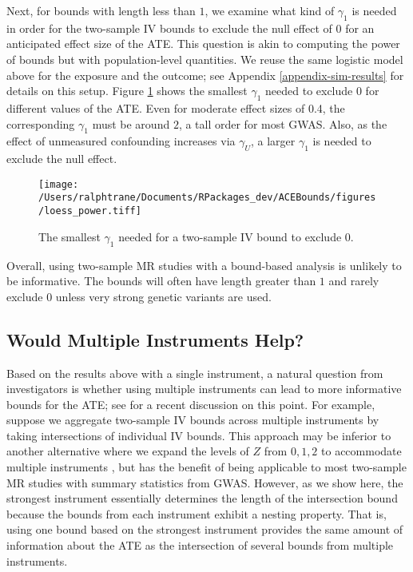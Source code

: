 \documentclass[AMA,STIX1COL,]{WileyNJD-v2}
\begin{document}
Next, for bounds with length less than \(1\), we examine what kind of
\(\gamma_1\) is needed in order for the two-sample IV bounds to exclude
the null effect of \(0\) for an anticipated effect size of the ATE. This
question is akin to computing the power of bounds but with
population-level quantities. We reuse the same logistic model above for
the exposure and the outcome; see Appendix \ref{appendix-sim-results}
for details on this setup. Figure \ref{fig:power_curves} shows the
smallest \(\gamma_1\) needed to exclude \(0\) for different values of
the ATE. Even for moderate effect sizes of 0.4, the corresponding
\(\gamma_1\) must be around \(2\), a tall order for most GWAS. Also, as
the effect of unmeasured confounding increases via \(\gamma_U\), a
larger \(\gamma_1\) is needed to exclude the null effect.

\begin{figure}[ht]
  \centering
  \texttt{[image: /Users/ralphtrane/Documents/RPackages\_dev/ACEBounds/figures/loess\_power.tiff]}
  \caption{The smallest $\gamma_1$ needed for a two-sample IV bound to exclude $0$.}
  \label{fig:power_curves}
\end{figure}

Overall, using two-sample MR studies with a bound-based analysis is
unlikely to be informative. The bounds will often have length greater
than \(1\) and rarely exclude \(0\) unless very strong genetic variants
are used.

\hypertarget{would-multiple-instruments-help}{%
\subsection{Would Multiple Instruments
Help?}\label{would-multiple-instruments-help}}

Based on the results above with a single instrument, a natural question
from investigators is whether using multiple instruments can lead to
more informative bounds for the ATE; see \citep{swanson_commentary_2017}
for a recent discussion on this point. For example, suppose we aggregate
two-sample IV bounds across multiple instruments by taking intersections
of individual IV bounds. This approach may be inferior to another
alternative where we expand the levels of \(Z\) from \(0,1,2\) to
accommodate multiple instruments \citep{swanson_commentary_2017}, but
has the benefit of being applicable to most two-sample MR studies with
summary statistics from GWAS. However, as we show here, the strongest
instrument essentially determines the length of the intersection bound
because the bounds from each instrument exhibit a nesting property. That
is, using one bound based on the strongest instrument provides the same
amount of information about the ATE as the intersection of several
bounds from multiple instruments.
\end{document}
